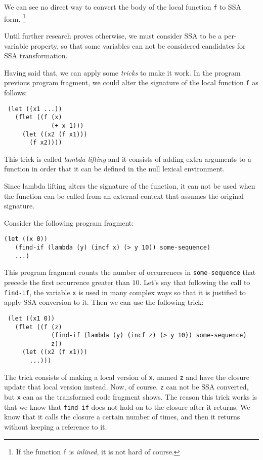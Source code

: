 We can see no direct way to convert the body of the local function
\texttt{f} to SSA form.%
\footnote{If the function \texttt{f} is \emph{inlined}, it is not hard
  of course.}

Until further research proves otherwise, we must consider SSA to be a
per-variable property, so that some variables can not be considered
candidates for SSA transformation.

Having said that, we can apply some \emph{tricks} to make it work.  In
the program previous program fragment, we could alter the signature of
the local function \texttt{f} as follows:

\begin{verbatim}
 (let ((x1 ...))
   (flet ((f (x)
             (+ x 1)))
     (let ((x2 (f x1)))
       (f x2))))
\end{verbatim}

This trick is called \emph{lambda lifting} and it consists of adding
extra arguments to a function in order that it can be defined in the
null lexical environment.  

Since lambda lifting alters the signature of the function, it can not
be used when the function can be called from an external context that
assumes the original signature. 

Consider the following program fragment:

\begin{verbatim}
(let ((x 0))
   (find-if (lambda (y) (incf x) (> y 10)) some-sequence)
   ...)
\end{verbatim}

This program fragment counts the number of occurrences in
\texttt{some-sequence} that precede the first occurrence greater than
$10$.  Let's say that following the call to \texttt{find-if}, the
variable \texttt{x} is used in many complex ways so that it is
justified to apply SSA conversion to it.  Then we can use the
following trick:

\begin{verbatim}
 (let ((x1 0))
   (flet ((f (z)
             (find-if (lambda (y) (incf z) (> y 10)) some-sequence)
             z))
     (let ((x2 (f x1)))
       ...)))
\end{verbatim}

The trick consists of making a local version of \texttt{x}, named
\texttt{z} and have the closure update that local version instead.
Now, of course, \texttt{z} can not be SSA converted, but \texttt{x}
can as the transformed code fragment shows.  The reason this trick
works is that we know that \texttt{find-if} does not hold on to the
closure after it returns.  We know that it calls the closure a certain
number of times, and then it returns without keeping a reference to
it.%

